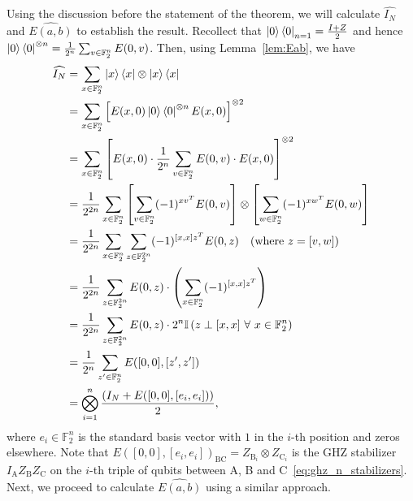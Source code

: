 \documentclass[journal,onecolumn]{IEEEtran}
\newcommand{\ghzmap}[1]{\widehat{#1}}
\begin{document}
Using the discussion before the statement of the theorem, we will calculate $\ghzmap{I_N}$ and $\ghzmap{E(a,b)}$ to establish the result.
Recollect that $\dketbra{0}_{n=1} = \frac{I + Z}{2}$ and hence $\dketbra{0}^{\otimes n} = \frac{1}{2^n} \sum_{v \in \mathbb{F}_2^n} E(0,v)$.
Then, using Lemma~\ref{lem:Eab}, we have
\begin{align}
\ghzmap{I_N} & = \sum_{x \in \mathbb{F}_2^n} \dketbra{x} \otimes \dketbra{x} \\
%
  & = \sum_{x \in \mathbb{F}_2^n} \left[ E(x,0) \dketbra{0}^{\otimes n} E(x,0) \right]^{\otimes 2} \\
%
  & = \sum_{x \in \mathbb{F}_2^n} \left[ E(x,0) \cdot \frac{1}{2^n} \sum_{v \in \mathbb{F}_2^n} E(0,v) \cdot E(x,0) \right]^{\otimes 2} \\
%
  & = \frac{1}{2^{2n}} \sum_{x \in \mathbb{F}_2^n} \left[ \sum_{v \in \mathbb{F}_2^n} (-1)^{xv^T} E(0,v) \right] \otimes \left[ \sum_{w \in \mathbb{F}_2^n} (-1)^{xw^T} E(0,w) \right] \\
%
  & = \frac{1}{2^{2n}} \sum_{x \in \mathbb{F}_2^n} \sum_{z \in \mathbb{F}_2^{2n}} (-1)^{[x,x] z^T} E(0,z) \quad (\text{where}\ z = [v,w]) \\
%
  & = \frac{1}{2^{2n}} \sum_{z \in \mathbb{F}_2^{2n}} E(0,z) \cdot \left( \sum_{x \in \mathbb{F}_2^n} (-1)^{[x,x] z^T} \right) \\
%
  & = \frac{1}{2^{2n}} \sum_{z \in \mathbb{F}_2^{2n}} E(0,z) \cdot 2^n \mathbb{I}\left(z \perp [x,x] \ \forall \ x \in \mathbb{F}_2^n \right) \\
%
  & = \frac{1}{2^n} \sum_{z' \in \mathbb{F}_2^n} E([0,0],[z',z']) \\
%
  & = \bigotimes_{i=1}^n \frac{\left( I_N + E([0,0],[e_i,e_i]) \right)}{2},
\end{align}
where $e_i \in \mathbb{F}_2^n$ is the standard basis vector with $1$ in the $i$-th position and zeros elsewhere.
Note that $E([0,0],[e_i,e_i])_{\text{BC}} = Z_{\text{B}_i} \otimes Z_{\text{C}_i}$ is the GHZ stabilizer $I_{\text{A}} Z_{\text{B}} Z_{\text{C}}$ on the $i$-th triple of qubits between A, B and C~\eqref{eq:ghz_n_stabilizers}.
Next, we proceed to calculate $\ghzmap{E(a,b)}$ using a similar approach.
\end{document}
